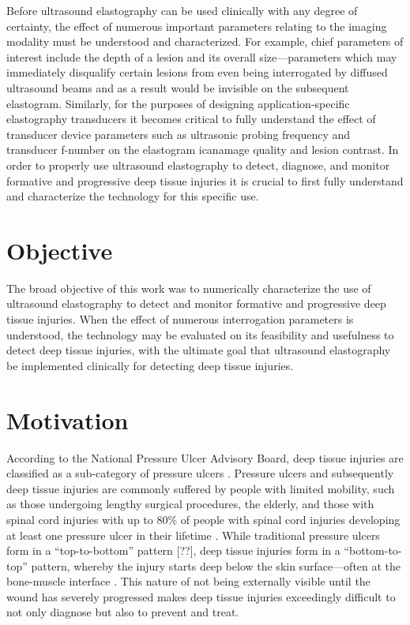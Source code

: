 {	Before ultrasound elastography can be used clinically with any degree of certainty, the effect of numerous important parameters relating to the imaging modality must be understood and characterized. For example, chief parameters of interest include the depth of a lesion and its overall size---parameters which may immediately disqualify certain lesions from even being interrogated by diffused ultrasound beams and as a result would be invisible on the subsequent elastogram. Similarly, for the purposes of designing application-specific elastography transducers it becomes critical to fully understand the effect of transducer device parameters such as ultrasonic probing frequency and transducer f-number on the elastogram icanamage quality and lesion contrast. In order to properly use ultrasound elastography to detect, diagnose, and monitor formative and progressive deep tissue injuries it is crucial to first fully understand and characterize the technology for this specific use.

	\section{Objective}
		The broad objective of this work was to numerically characterize the use of ultrasound elastography to detect and monitor formative and progressive deep tissue injuries. When the effect of numerous interrogation parameters is understood, the technology may be evaluated on its feasibility and usefulness to detect deep tissue injuries, with the ultimate goal that ultrasound elastography be implemented clinically for detecting deep tissue injuries.

	\section{Motivation}
		According to the National Pressure Ulcer Advisory Board, deep tissue injuries are classified as a sub-category of pressure ulcers \cite{black11}. Pressure ulcers and subsequently deep tissue injuries are commonly suffered by people with limited mobility, such as those undergoing lengthy surgical procedures, the elderly, and those with spinal cord injuries \cite{allman95} with up to \unit{80}{\%} of people with spinal cord injuries developing at least one pressure ulcer in their lifetime \cite{salzberg96}. While traditional pressure ulcers form in a ``top-to-bottom'' pattern [??], deep tissue injuries form in a ``bottom-to-top'' pattern, whereby the injury starts deep below the skin surface---often at the bone-muscle interface \cite{kanno09}. This nature of not being externally visible until the wound has severely progressed makes deep tissue injuries exceedingly difficult to not only diagnose but also to prevent and treat.

}
